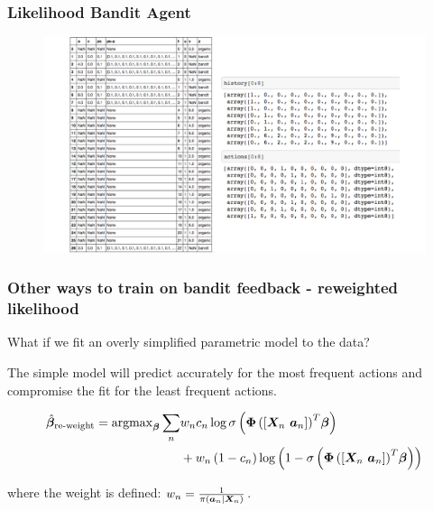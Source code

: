 \begin{frame}
  \frametitle{Likelihood Bandit Agent}
\begin{figure}[h!]
\includegraphics[scale=0.3]{images/feature_engineering.png}
\centering
\end{figure}
\end{frame}





\begin{frame}
  \frametitle{Other ways to train on bandit feedback - reweighted likelihood}

  What if we fit an overly simplified parametric model to the data?
  \pause

  The simple model will predict accurately for the most frequent actions and compromise the fit for the least frequent actions.


\begin{align*}
	\hat{\bm{\beta}}_{\operatorname{re-weight}} =  {\rm argmax}_{\bm{\beta}}
	\sum_n
	& w_n c_n \log \sigma
		\left(
			{\bm{\Phi}
				\left(
					\left[ {\bm{X}}_n ~ {\bm{a}}_n \right]
				\right)
			}^T \bm{\beta}
		\right)  \\
	& + w_n \left( 1-c_n \right)
		\log
			\left(
				1 - \sigma
					\left(
						{\bm{\Phi} \left(
								\left[ {\bm{X}}_n ~ {\bm{a}}_n \right]
							\right)
						}^T \bm{\beta}
					\right)
			\right)
\end{align*}

where the weight is defined: $w_n = \frac{1}{\pi\left( {\bm{a}}_n | {\bm{X}}_n \right)}$.

\end{frame}


